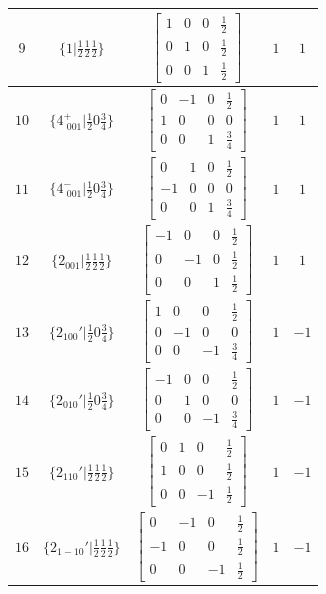 \documentclass[fleqn,8pt]{jsarticle}
\begin{document}
\begin{longtable}{ccccc}
$ 9 $ & $ \{1|\frac{1}{2} \frac{1}{2} \frac{1}{2}\} $ & $ \begin{bmatrix} 1 & 0 & 0 & \frac{1}{2} \\ 0 & 1 & 0 & \frac{1}{2} \\ 0 & 0 & 1 & \frac{1}{2} \end{bmatrix} $ & $ 1 $ & $ 1 $ \\ \hline
$ 10 $ & $ \{4^{+}_{\,\,001}|\frac{1}{2} 0 \frac{3}{4}\} $ & $ \begin{bmatrix} 0 & -1 & 0 & \frac{1}{2} \\ 1 & 0 & 0 & 0 \\ 0 & 0 & 1 & \frac{3}{4} \end{bmatrix} $ & $ 1 $ & $ 1 $ \\ \hline
$ 11 $ & $ \{4^{-}_{\,\,001}|\frac{1}{2} 0 \frac{3}{4}\} $ & $ \begin{bmatrix} 0 & 1 & 0 & \frac{1}{2} \\ -1 & 0 & 0 & 0 \\ 0 & 0 & 1 & \frac{3}{4} \end{bmatrix} $ & $ 1 $ & $ 1 $ \\ \hline
$ 12 $ & $ \{2{}_{001}|\frac{1}{2} \frac{1}{2} \frac{1}{2}\} $ & $ \begin{bmatrix} -1 & 0 & 0 & \frac{1}{2} \\ 0 & -1 & 0 & \frac{1}{2} \\ 0 & 0 & 1 & \frac{1}{2} \end{bmatrix} $ & $ 1 $ & $ 1 $ \\ \hline
$ 13 $ & $ \{2{}_{100}{}'|\frac{1}{2} 0 \frac{3}{4}\} $ & $ \begin{bmatrix} 1 & 0 & 0 & \frac{1}{2} \\ 0 & -1 & 0 & 0 \\ 0 & 0 & -1 & \frac{3}{4} \end{bmatrix} $ & $ 1 $ & $ -1 $ \\ \hline
$ 14 $ & $ \{2{}_{010}{}'|\frac{1}{2} 0 \frac{3}{4}\} $ & $ \begin{bmatrix} -1 & 0 & 0 & \frac{1}{2} \\ 0 & 1 & 0 & 0 \\ 0 & 0 & -1 & \frac{3}{4} \end{bmatrix} $ & $ 1 $ & $ -1 $ \\ \hline
$ 15 $ & $ \{2{}_{110}{}'|\frac{1}{2} \frac{1}{2} \frac{1}{2}\} $ & $ \begin{bmatrix} 0 & 1 & 0 & \frac{1}{2} \\ 1 & 0 & 0 & \frac{1}{2} \\ 0 & 0 & -1 & \frac{1}{2} \end{bmatrix} $ & $ 1 $ & $ -1 $ \\ \hline
$ 16 $ & $ \{2{}_{1-10}{}'|\frac{1}{2} \frac{1}{2} \frac{1}{2}\} $ & $ \begin{bmatrix} 0 & -1 & 0 & \frac{1}{2} \\ -1 & 0 & 0 & \frac{1}{2} \\ 0 & 0 & -1 & \frac{1}{2} \end{bmatrix} $ & $ 1 $ & $ -1 $ \\
\end{longtable}
\end{document}
